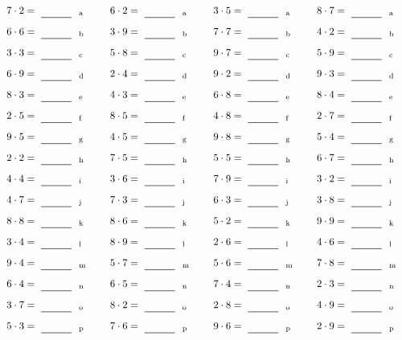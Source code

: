 \documentclass
[
  draft    = true,
  fontsize = 11pt,
  parskip  = half-
]
{scrartcl}
\begin{document}
\par\vfill\par
\begin{align*}
    \pline{7\cdot2}&=\rline{a}
  & \pline{6\cdot2}&=\rline{a}
  & \pline{3\cdot5}&=\rline{a}
  & \pline{8\cdot7}&=\rline{a} \\[1ex]
    \pline{6\cdot6}&=\rline{b}
  & \pline{3\cdot9}&=\rline{b}
  & \pline{7\cdot7}&=\rline{b}
  & \pline{4\cdot2}&=\rline{b} \\[1ex]
    \pline{3\cdot3}&=\rline{c}
  & \pline{5\cdot8}&=\rline{c}
  & \pline{9\cdot7}&=\rline{c}
  & \pline{5\cdot9}&=\rline{c} \\[1ex]
    \pline{6\cdot9}&=\rline{d}
  & \pline{2\cdot4}&=\rline{d}
  & \pline{9\cdot2}&=\rline{d}
  & \pline{9\cdot3}&=\rline{d} \\[1ex]
    \pline{8\cdot3}&=\rline{e}
  & \pline{4\cdot3}&=\rline{e}
  & \pline{6\cdot8}&=\rline{e}
  & \pline{8\cdot4}&=\rline{e} \\[1ex]
    \pline{2\cdot5}&=\rline{f}
  & \pline{8\cdot5}&=\rline{f}
  & \pline{4\cdot8}&=\rline{f}
  & \pline{2\cdot7}&=\rline{f} \\[1ex]
    \pline{9\cdot5}&=\rline{g}
  & \pline{4\cdot5}&=\rline{g}
  & \pline{9\cdot8}&=\rline{g}
  & \pline{5\cdot4}&=\rline{g} \\[1ex]
    \pline{2\cdot2}&=\rline{h}
  & \pline{7\cdot5}&=\rline{h}
  & \pline{5\cdot5}&=\rline{h}
  & \pline{6\cdot7}&=\rline{h} \\[1ex]
    \pline{4\cdot4}&=\rline{i}
  & \pline{3\cdot6}&=\rline{i}
  & \pline{7\cdot9}&=\rline{i}
  & \pline{3\cdot2}&=\rline{i} \\[1ex]
    \pline{4\cdot7}&=\rline{j}
  & \pline{7\cdot3}&=\rline{j}
  & \pline{6\cdot3}&=\rline{j}
  & \pline{3\cdot8}&=\rline{j} \\[1ex]
    \pline{8\cdot8}&=\rline{k}
  & \pline{8\cdot6}&=\rline{k}
  & \pline{5\cdot2}&=\rline{k}
  & \pline{9\cdot9}&=\rline{k} \\[1ex]
    \pline{3\cdot4}&=\rline{l}
  & \pline{8\cdot9}&=\rline{l}
  & \pline{2\cdot6}&=\rline{l}
  & \pline{4\cdot6}&=\rline{l} \\[1ex]
    \pline{9\cdot4}&=\rline{m}
  & \pline{5\cdot7}&=\rline{m}
  & \pline{5\cdot6}&=\rline{m}
  & \pline{7\cdot8}&=\rline{m} \\[1ex]
    \pline{6\cdot4}&=\rline{n}
  & \pline{6\cdot5}&=\rline{n}
  & \pline{7\cdot4}&=\rline{n}
  & \pline{2\cdot3}&=\rline{n} \\[1ex]
    \pline{3\cdot7}&=\rline{o}
  & \pline{8\cdot2}&=\rline{o}
  & \pline{2\cdot8}&=\rline{o}
  & \pline{4\cdot9}&=\rline{o} \\[1ex]
    \pline{5\cdot3}&=\rline{p}
  & \pline{7\cdot6}&=\rline{p}
  & \pline{9\cdot6}&=\rline{p}
  & \pline{2\cdot9}&=\rline{p}
\end{align*}
\end{document}

